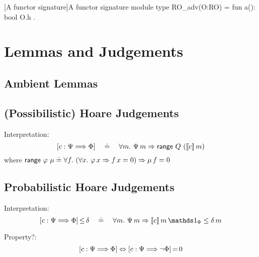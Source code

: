 \begin{easycrypt}[label={lst:functorsig}]{[A functor signature]A functor signature}
module type RO_adv(O:RO) = {
  fun a(): bool { O.h }
}.
\end{easycrypt}

\section{Lemmas and Judgements}


\subsection{Ambient Lemmas}

\subsection{(Possibilistic) Hoare Judgements}

Interpretation:
\begin{displaymath}
\left[{c}:{\Psi}\Longrightarrow{\Phi}\right]
\quad\doteq\quad
\forall m.~ \Psi\,m \Rightarrow \mathsf{range}~{Q}~{(}[\![ c ]\!]\,m)
\end{displaymath}
%
where $\mathsf{range}~{\varphi}~{\mu} \doteq \forall f.~ (\forall x.~ \varphi\,x
\Rightarrow f\,x=0) \Rightarrow \mu\,f=0$




\subsection{Probabilistic Hoare Judgements}

Interpretation:
\begin{displaymath}
\HoareLe{c}{\pre}{\post}{\delta} 
\quad\doteq\quad
\forall m.~ \pre\,m \Rightarrow [\![ c ]\!]\,m\,\charfun_\post \leq
\delta\,m
\end{displaymath}

Property?:
\begin{displaymath}
\left[{c}:{\Psi}\Longrightarrow{\Phi}\right]
\Leftrightarrow
{\left[{c}:{\Psi}\Longrightarrow{\neg\Phi}\right]}\,{=}\,{0}
\end{displaymath}

